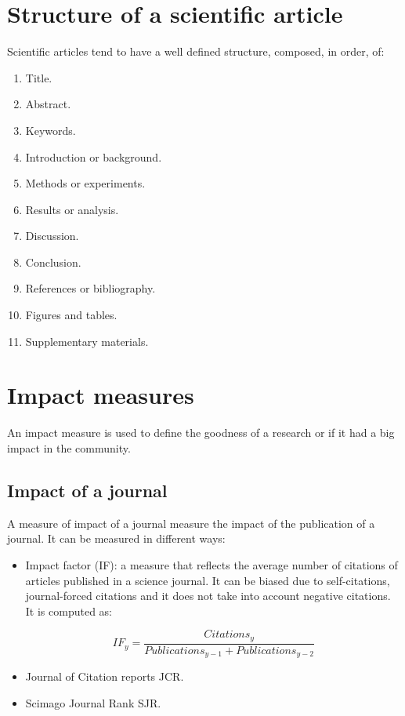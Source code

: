\section{Structure of a scientific article}
Scientific articles tend to have a well defined structure, composed, in order, of:

\begin{multicols}{3}
	\begin{enumerate}
		\item Title.
		\item Abstract.
		\item Keywords.
		\item Introduction or background.
		\item Methods or experiments.
		\item Results or analysis.
		\item Discussion.
		\item Conclusion.
		\item References or bibliography.
		\item Figures and tables.
		\item Supplementary materials.
	\end{enumerate}
\end{multicols}

\section{Impact measures}
An impact measure is used to define the goodness of a research or if it had a big impact in the community.

	\subsection{Impact of a journal}
	A measure of impact of a journal measure the impact of the publication of a journal.
	It can be measured in different ways:

	\begin{multicols}{2}
		\begin{itemize}
			\item Impact factor (IF): a measure that reflects the average number of citations of articles published in a science journal.
				It can be biased due to self-citations, journal-forced citations and it does not take into account negative citations.
				It is computed as:

				$$IF_y = \frac{Citations_y}{Publications_{y-1}+Publications_{y-2}}$$

			\item Journal of Citation reports JCR.
			\item Scimago Journal Rank SJR.
		\end{itemize}
	\end{multicols}

